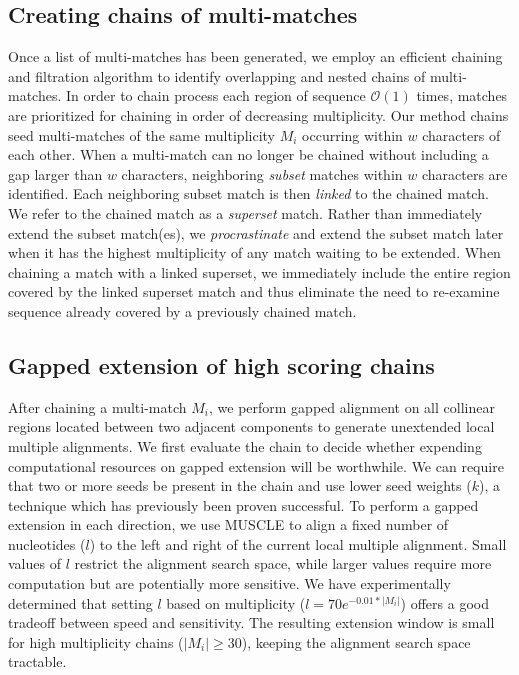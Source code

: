 \documentclass{ws-procs975x65}
\begin{document}
\subsection{Creating chains of multi-matches}
Once a list of multi-matches has been generated, we employ an efficient chaining and filtration algorithm to identify overlapping and nested chains of multi-matches\cite{ref-procrast}. In order to chain process each region of sequence $\mathcal{O}(1)$ times, matches are prioritized for chaining in order of decreasing multiplicity.  Our method chains seed multi-matches of the same multiplicity $M_{i}$ occurring within $w$
characters of each other.
When a multi-match can no
longer be chained without including a gap larger than $w$
characters, neighboring \textit{subset}
matches within $w$ characters are identified. Each 
neighboring subset match is then \textit{linked} to the chained match. We refer to the
chained match as a \textit{superset} match. Rather than immediately
extend the subset match(es), we \textit{procrastinate} and extend
the subset match later when it has the highest multiplicity of any
match waiting to be extended. When chaining a match with a linked
superset, we immediately include the entire region covered by the linked superset
match and thus eliminate the need to re-examine sequence already covered by
a previously chained match.  

\subsection{Gapped extension of high scoring chains}

After chaining a multi-match $M_i$, we perform gapped alignment on all collinear regions located between two adjacent components to generate unextended local multiple alignments. We first evaluate the chain to decide whether expending computational resources on gapped extension will be worthwhile. We can require that two or more seeds be present in the chain and use lower seed weights ($k$), a technique which has previously been proven successful\cite{ref-blastz,ref-gappedblast,ref-blat}.  To perform a gapped extension in each direction, we use MUSCLE to align a fixed number of nucleotides ($l$) to the left and right of the current local multiple alignment.
Small values of $l$ restrict the alignment search space, while larger values require more computation but are potentially more sensitive.  We have experimentally determined that setting $l$ based on multiplicity ($l = 70e^{-0.01*|M_{i}|}$) offers a good tradeoff between speed and sensitivity.  The resulting extension window is small for high multiplicity chains ($|M_{i}|\geq 30$), keeping the alignment search space tractable.
\end{document}
